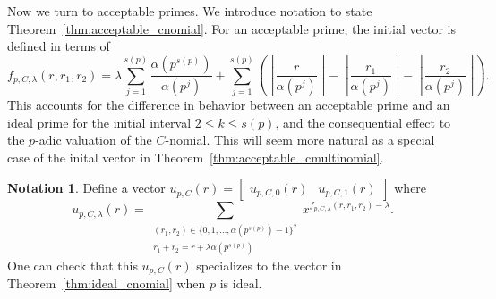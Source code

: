 \documentclass{amsart}
\theoremstyle{definition}
\newtheorem*{notation*}{Notation}
\begin{document}
Now we turn to acceptable primes. We introduce notation to state Theorem~\ref{thm:acceptable_cnomial}. For an acceptable prime, the initial vector is defined in terms of
$$f_{p,C,\lambda}(r,r_1,r_2)=\lambda\sum_{j=1}^{s(p)}\frac{\alpha(p^{s(p)})}{\alpha(p^{j})} + \sum_{j=1}^{s(p)}\left(\! \left\lfloor\frac{r}{\alpha(p^{j})} \right\rfloor - \left\lfloor\frac{r_1}{\alpha(p^{j})} \right\rfloor - \left\lfloor\frac{r_2}{\alpha(p^{j})} \right\rfloor \right).$$
This accounts for the difference in behavior between an acceptable prime and an ideal prime for the initial interval $2 \leq k \leq s(p)$, and the consequential effect to the $p$-adic valuation of the $C$-nomial. This will seem more natural as a special case of the inital vector in Theorem~\ref{thm:acceptable_cmultinomial}.
\begin{notation*} Define a vector $u_{p,C}(r)=\begin{bmatrix}
    u_{p,C,0}(r)&u_{p,C,1}(r)
\end{bmatrix}$ where 
$$u_{p,C,\lambda}(r)=\sum_{\substack{(r_1,r_2) \in \{0, 1, \ldots, \alpha(p^{s(p)})-1\}^2 \\ r_1+r_2 = r+\lambda\alpha(p^{s(p)})}}x^{f_{p,C,\lambda}(r, r_1,r_2)-\lambda} .$$
One can check that this $u_{p,C}(r)$ specializes to the vector in Theorem~\ref{thm:ideal_cnomial} when $p$ is ideal.
\end{notation*}
\end{document}
